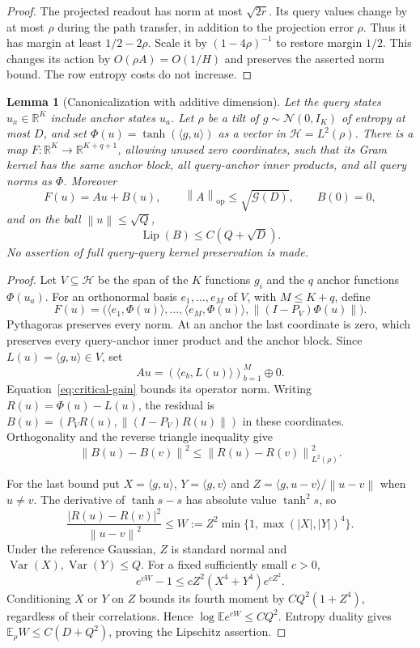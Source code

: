 \documentclass[11pt]{article}
\newtheorem{lemma}[theorem]{Lemma}
\theoremstyle{remark}
\newcommand{\R}{\mathbb R}
\newcommand{\E}{\mathbb E}
\newcommand{\Lip}{\operatorname{Lip}}
\newcommand{\Gain}{\mathcal G}
\newcommand{\norm}[1]{\left\lVert #1\right\rVert}
\begin{document}
\begin{proof}
The projected readout has norm at most $\sqrt{2r}$. Its query
values change by at most $\rho$ during the path transfer, in
addition to the projection error $\rho$. Thus it has margin at
least $1/2-2\rho$. Scale it by $(1-4\rho)^{-1}$ to restore
margin $1/2$. This changes its action by $O(\rho A)=O(1/H)$ and
preserves the asserted norm bound. The row entropy costs do not
increase.
\end{proof}

\begin{lemma}[Canonicalization with additive dimension]
\label{lem:critical-canonical}
Let the query states $u_x\in\R^K$ include anchor states $u_a$.
Let $\rho$ be a tilt of $g\sim\mathcal N(0,I_K)$ of entropy at
most $D$, and set $\Phi(u)=\tanh(\langle g,u\rangle)$ as a vector
in $\mathcal H=L^2(\rho)$. There is a map
$F:\R^K\to\R^{K+q+1}$, allowing unused zero coordinates, such that
its Gram kernel has the same anchor block, all query-anchor inner
products, and all query norms as $\Phi$. Moreover
\[
 F(u)=Au+B(u),\qquad
 \norm A_{\mathrm{op}}\le\sqrt{\Gain(D)},\qquad B(0)=0,
\]
and on the ball $\norm u\le\sqrt Q$,
\[
 \Lip(B)\le C(Q+\sqrt D).
\]
No assertion of full query-query kernel preservation is made.
\end{lemma}
\begin{proof}
Let $V\subseteq\mathcal H$ be the span of the $K$ functions $g_i$
and the $q$ anchor functions $\Phi(u_a)$. For an orthonormal basis
$e_1,\ldots,e_M$ of $V$, with $M\le K+q$, define
\[
 F(u)=\bigl(\langle e_1,\Phi(u)\rangle,\ldots,
       \langle e_M,\Phi(u)\rangle,
       \norm{(I-P_V)\Phi(u)}\bigr).
\]
Pythagoras preserves every norm. At an anchor the last coordinate
is zero, which preserves every query-anchor inner product and the
anchor block. Since $L(u)=\langle g,u\rangle\in V$, set
\[
 Au=(\langle e_b,L(u)\rangle)_{b=1}^M\oplus0.
\]
Equation~\eqref{eq:critical-gain} bounds its operator norm. Writing
$R(u)=\Phi(u)-L(u)$, the residual is
$B(u)=(P_VR(u),\norm{(I-P_V)R(u)})$ in these coordinates.
Orthogonality and the reverse triangle inequality give
\[
 \norm{B(u)-B(v)}^2\le\norm{R(u)-R(v)}_{L^2(\rho)}^2.
\]

For the last bound put $X=\langle g,u\rangle$,
$Y=\langle g,v\rangle$ and
$Z=\langle g,u-v\rangle/\norm{u-v}$ when $u\ne v$.
The derivative of $\tanh s-s$ has absolute value $\tanh^2s$, so
\[
 \frac{|R(u)-R(v)|^2}{\norm{u-v}^2}
 \le W:=Z^2\min\{1,\max(|X|,|Y|)^4\}.
\]
Under the reference Gaussian, $Z$ is standard normal and
$\operatorname{Var}(X),\operatorname{Var}(Y)\le Q$. For a fixed
sufficiently small $c>0$,
\[
 e^{cW}-1\le cZ^2(X^4+Y^4)e^{cZ^2}.
\]
Conditioning $X$ or $Y$ on $Z$ bounds its fourth moment by
$CQ^2(1+Z^4)$, regardless of their correlations. Hence
$\log\E e^{cW}\le CQ^2$. Entropy duality gives
$\E_\rho W\le C(D+Q^2)$, proving the Lipschitz assertion.
\end{proof}
\end{document}
